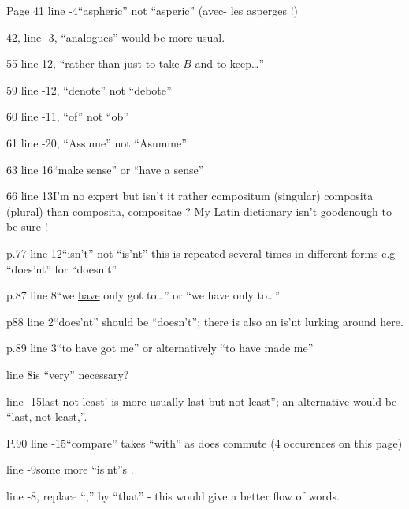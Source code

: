 Page 41 \unsure{-}line -4\quad ``aspheric'' not ``asperic'' (avec- les asperges !)

42, line -3, ``analogues'' would be more usual.

55 line 12, ``rather than just \uline{to} take $B$ and \uline{to} keep\ldots''

59 line -12, ``denote'' not ``debote''

60 line -11, ``of'' not ``ob''

61 line -20, ``Assume'' not ``Asumme''

63 line 16\quad ``make sense'' or ``have a sense''

66 line 13\quad I'm no  expert but isn't it rather compositum (singular) composita (plural) than composita, compositae ? My Latin dictionary isn't goodenough to be sure !

p.77 line 12\quad ``isn't'' not ``is'nt'' this is repeated several times in different forms e.g ``does'nt'' for ``doesn't''

p.87 line 8\quad ``we \uline{have} only got to\ldots'' or ``we have only to\ldots''

p88 line 2\quad ``does'nt'' should be ``doesn't''; there is also an is'nt lurking around here.

p.89 line 3\quad ``to have got me'' or alternatively ``to have made me''

line 8\quad is ``very'' necessary?

line -15\quad {}last not least' is more usually last but not least''; an alternative would be ``last, not least,''.

P.90 line -15\quad ``compare'' takes ``with'' as does commute (4 occurences on this page)

line -9\quad some more ``is'nt''s .

line -8, replace ``,'' by ``that'' - this would give a better flow of words.

